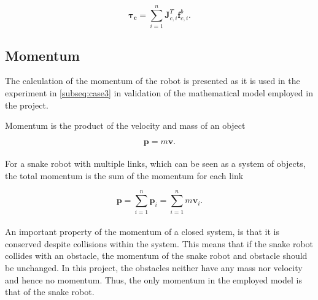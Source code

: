 \begin{equation}\label{eq:tauforcerel}
    \boldsymbol{\tau_c} = \sum_{i=1}^{n} \mathbf{J}^T_{c,i} \mathbf{f}^b_{c,i}.
\end{equation}

\subsection{Momentum}\label{subseq:momentum}

The calculation of the momentum of the robot is presented as it is used in the experiment in \ref{subseq:case3} in validation of the mathematical model employed in the project.

Momentum is the product of the velocity and mass of an object

\begin{equation}
    \mathbf{p} = m \mathbf{v}.
\end{equation}
\\
For a snake robot with multiple links, which can be seen as a system of objects, the total momentum is the sum of the momentum for each link

\begin{equation}\label{eq:momentum}
    \mathbf{p} = \sum_{i=1}^{n}\mathbf{p}_i = \sum_{i=1}^{n}m\mathbf{v}_i.
\end{equation}
\\
An important property of the momentum of a closed system, is that it is conserved despite collisions within the system. This means that if the snake robot collides with an obstacle, the momentum of the snake robot and obstacle should be unchanged. In this project, the obstacles neither have any mass nor velocity and hence no momentum. Thus, the only momentum in the employed model is that of the snake robot.







